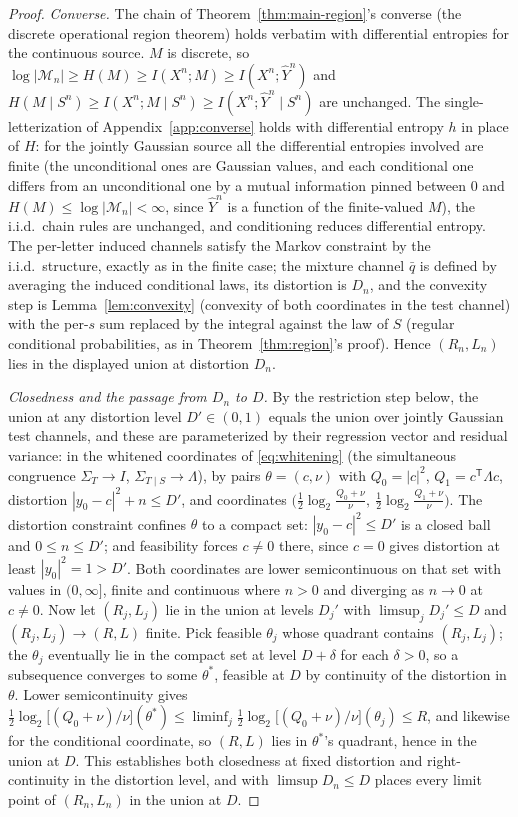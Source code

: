﻿\documentclass[11pt,onecolumn]{IEEEtran}
\newcommand{\hY}{\widehat{Y}}
\begin{document}
\begin{proof}
\emph{Converse.} The chain of Theorem~\ref{thm:main-region}'s converse
(the discrete operational region theorem) holds verbatim with
differential entropies for the continuous source.
$M$ is discrete, so $\log|\mathcal M_n|\ge H(M)\ge I(X^n;M)\ge
I(X^n;\hY^n)$ and $H(M\mid S^n)\ge I(X^n;M\mid S^n)\ge
I(X^n;\hY^n\mid S^n)$ are unchanged. The single-letterization of
Appendix~\ref{app:converse} holds with differential entropy $h$ in place of $H$: for the
jointly Gaussian source all the differential entropies involved are
finite (the unconditional ones are Gaussian values, and each
conditional one differs from an unconditional one by a mutual
information pinned between $0$ and
$H(M)\le\log|\mathcal M_n|<\infty$, since $\hY^n$ is a function of the
finite-valued $M$), the i.i.d.\ chain rules are unchanged, and
conditioning reduces differential entropy. The per-letter induced channels satisfy the
Markov constraint by the i.i.d.\ structure, exactly as in the finite
case; the mixture channel $\bar q$ is defined by averaging the induced
conditional laws, its distortion is $D_n$, and the convexity step is
Lemma~\ref{lem:convexity} (convexity of both coordinates in the test
channel) with the per-$s$ sum replaced by the integral
against the law of $S$ (regular conditional probabilities, as in
Theorem~\ref{thm:region}'s proof). Hence
$(R_n,L_n)$ lies in the displayed union at distortion $D_n$.

\emph{Closedness and the passage from $D_n$ to $D$.} By the restriction
step below, the union at any distortion level $D'\in(0,1)$ equals the
union over jointly Gaussian test channels, and these are parameterized
by their regression vector and residual variance: in the whitened
coordinates of \eqref{eq:whitening} (the simultaneous congruence
$\Sigma_T\to I$, $\Sigma_{T\mid S}\to\Lambda$), by pairs
$\theta=(c,\nu)$ with
$Q_0=|c|^2$, $Q_1=c^{\mathsf T}\Lambda c$, distortion
$|y_0-c|^2+n\le D'$, and coordinates
$\bigl(\tfrac12\log_2\tfrac{Q_0+\nu}{\nu},\
\tfrac12\log_2\tfrac{Q_1+\nu}{\nu}\bigr)$. The distortion constraint
confines $\theta$ to a compact set: $|y_0-c|^2\le D'$ is a closed ball
and $0\le n\le D'$; and feasibility forces $c\ne0$ there, since $c=0$
gives distortion at least $|y_0|^2=1>D'$. Both coordinates are lower
semicontinuous on that set with values in $(0,\infty]$, finite and
continuous where $n>0$ and diverging as $n\to0$ at $c\ne0$. Now let
$(R_j,L_j)$ lie in the union at levels $D_j'$ with
$\limsup_jD_j'\le D$ and $(R_j,L_j)\to(R,L)$ finite. Pick feasible
$\theta_j$ whose quadrant contains $(R_j,L_j)$; the $\theta_j$
eventually lie in the compact set at level $D+\delta$ for each
$\delta>0$, so a subsequence converges to some $\theta^*$, feasible at
$D$ by continuity of the distortion in $\theta$. Lower semicontinuity
gives $\tfrac12\log_2\bigl[(Q_0+\nu)/\nu\bigr](\theta^*)\le
\liminf_j\tfrac12\log_2\bigl[(Q_0+\nu)/\nu\bigr](\theta_j)\le R$, and
likewise for the conditional coordinate, so $(R,L)$ lies in
$\theta^*$'s quadrant, hence in the union at $D$. This establishes
both closedness at fixed distortion and right-continuity in the
distortion level, and with $\limsup D_n\le D$ places every limit point
of $(R_n,L_n)$ in the union at $D$.


\end{proof}
\end{document}
